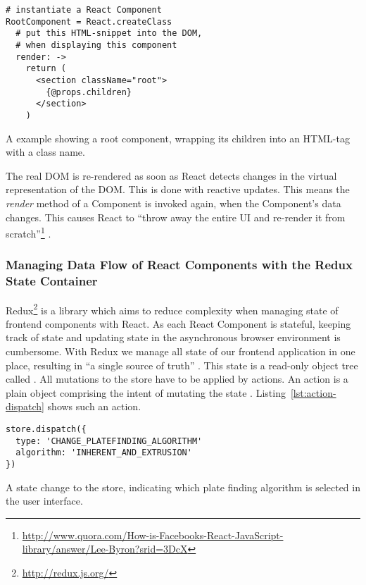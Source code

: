 \documentclass[../../ClassicThesis.tex]{subfiles}
\begin{document}
\begin{listing}[h]
\begin{verbatim}
# instantiate a React Component
RootComponent = React.createClass
  # put this HTML-snippet into the DOM,
  # when displaying this component
  render: ->
    return (
      <section className="root">
        {@props.children}
      </section>
    )
\end{verbatim}
\caption{A {\coffeescript} example showing a root component, wrapping
  its children into an HTML-tag with a class name.}
\label{lst:react-snippet}
\end{listing}

The real DOM is re-rendered as soon as React detects changes in the
virtual representation of the DOM. This is done with reactive updates.
This means the \textit{render} method of a Component is invoked again,
when the Component's data changes. This causes React to \enquote{throw
  away the entire UI and re-render it from
  scratch}\footnote{\url{http://www.quora.com/How-is-Facebooks-React-JavaScript-library/answer/Lee-Byron?srid=3DcX}}
\cite{React13}.


\subsubsection{Managing Data Flow of React Components with the Redux
  State Container}
\label{sec:flow-with-redux}

Redux\footnote{\url{http://redux.js.org/}} is a {\javascript} library
which aims to reduce complexity when managing state of frontend
components with React. As each React Component is stateful, keeping
track of state and updating state in the asynchronous browser
environment is cumbersome. With Redux we manage all state of our
frontend application in one place, resulting in \enquote{a single
  source of truth} \cite{redux}. This state is a read-only object
tree called . All mutations to the store have to be applied by
actions. An action is a plain object comprising the intent of
mutating the state \cite{redux}. Listing~\ref{lst:action-dispatch}
shows such an action.

\begin{listing}[h]
\begin{verbatim}
store.dispatch({
  type: 'CHANGE_PLATEFINDING_ALGORITHM'
  algorithm: 'INHERENT_AND_EXTRUSION'
})
\end{verbatim}
\caption{A state change to the store, indicating which plate finding
  algorithm is selected in the user interface.}
\label{lst:action-dispatch}
\end{listing}
\end{document}
